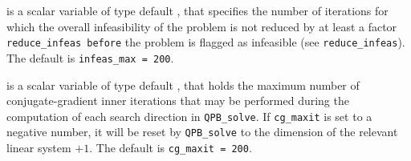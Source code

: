 \begin{description}




 is a scalar variable of type default \integer, that specifies
the number of iterations for which the overall infeasibility
of the problem is not reduced by at least a factor {\tt reduce\_infeas
before} the problem is flagged as infeasible (see {\tt reduce\_infeas}).
The default is {\tt infeas\_max = 200}.

 is a scalar variable of type default \integer, that holds the
maximum number of conjugate-gradient inner iterations that may be performed
during the computation of each search direction in {\tt QPB\_solve}.
If {\tt cg\_maxit} is set to a negative number, it will be reset by
{\tt QPB\_solve} to the dimension of the relevant linear system $+ 1$.
The default is {\tt cg\_maxit = 200}.




\end{description}
